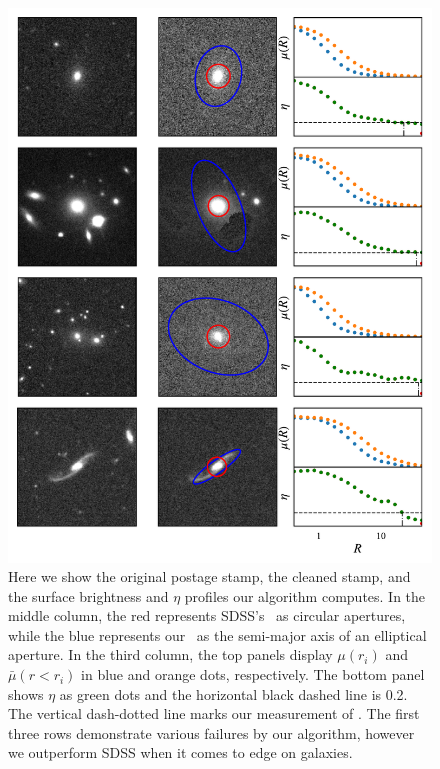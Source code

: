 \begin{figure}
\centering
\includegraphics[width=4.75in]{Figures/Rp_SBprofiles.pdf}
\caption[Surface brightness profiles and comparison of \rp~between our measurement and that provided by SDSS.]{Here we show the original postage stamp, the cleaned stamp, and the surface brightness and $\eta$ profiles our algorithm computes. In the middle column, the red represents SDSS's \rp~as circular apertures, while the blue represents our \rp~as the semi-major axis of an elliptical aperture. In the third column, the top panels display $\mu(r_i)$ and $\bar\mu(r<r_i)$ in blue and orange dots, respectively. The bottom panel shows $\eta$ as green dots and the horizontal black dashed line is 0.2. The vertical dash-dotted line marks our measurement of \rp. The first three rows demonstrate various failures by our algorithm, however we outperform SDSS when it comes to edge on galaxies.}
\label{fig: Rp and SB profiles}
\end{figure}

